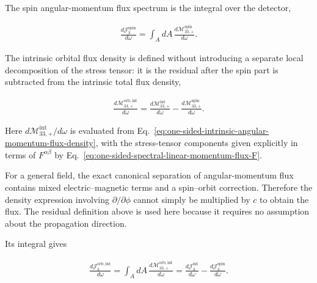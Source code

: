 The spin angular-momentum flux spectrum is the integral over the detector,
\begin{importantbox}
\begin{align}
  \frac{d\mathcal J^{\mathrm{spin}}_3}{d\omega}
  =\int_A dA\,
  \frac{d\mathcal M^{\mathrm{spin}}_{33,+}}{d\omega}.
  \label{eq:one-sided-spin-angular-momentum-flux}
\end{align}
\end{importantbox}

The intrinsic orbital flux density is defined without introducing a separate
local decomposition of the stress tensor: it is the residual after the spin
part is subtracted from the intrinsic total flux density,
\begin{importantbox}
\begin{align}
  \frac{d\mathcal M^{\mathrm{orb,int}}_{33,+}}{d\omega}
  =\frac{d\mathcal M^{\mathrm{int}}_{33,+}}{d\omega}
  -\frac{d\mathcal M^{\mathrm{spin}}_{33,+}}{d\omega}.
  \label{eq:one-sided-intrinsic-orbital-angular-momentum-flux-density}
\end{align}
\end{importantbox}
Here $d\mathcal M^{\mathrm{int}}_{33,+}/d\omega$ is evaluated from
Eq.~\eqref{eq:one-sided-intrinsic-angular-momentum-flux-density}, with the
stress-tensor components given explicitly in terms of $F^{\alpha\beta}$ by
Eq.~\eqref{eq:one-sided-spectral-linear-momentum-flux-F}.

\begin{highlightbox}[title={Why no simple azimuthal-derivative flux formula is used}]
  For a general field, the exact canonical separation of angular-momentum
  flux contains mixed electric--magnetic terms and a spin--orbit correction.
  Therefore the density expression involving $\partial/\partial\phi$ cannot
  simply be multiplied by $c$ to obtain the flux.  The residual definition
  above is used here because it requires no assumption about the propagation
  direction.
\end{highlightbox}

Its integral gives
\begin{importantbox}
\begin{align}
  \frac{d\mathcal J^{\mathrm{orb,int}}_3}{d\omega}
  =\int_A dA\,
  \frac{d\mathcal M^{\mathrm{orb,int}}_{33,+}}{d\omega}
  =\frac{d\mathcal J^{\mathrm{int}}_3}{d\omega}
  -\frac{d\mathcal J^{\mathrm{spin}}_3}{d\omega}.
  \label{eq:one-sided-intrinsic-orbital-angular-momentum-flux}
\end{align}
\end{importantbox}

